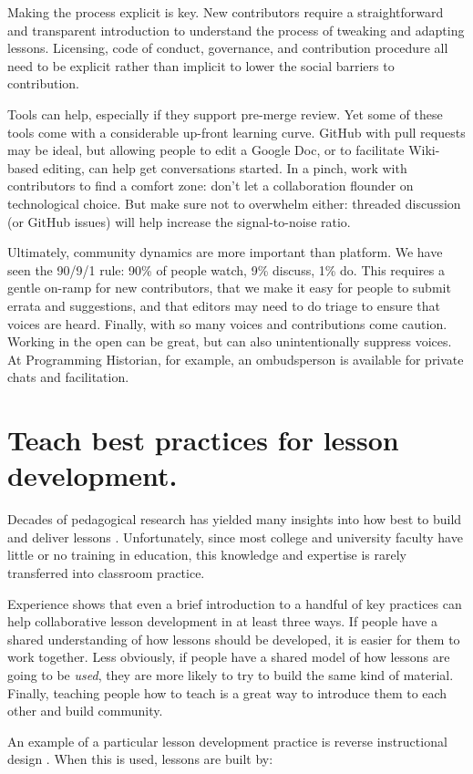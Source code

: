 \documentclass[10pt,letterpaper]{article}
\newcommand{\rulemajor}[1]{\section{#1}}
\begin{document}
Making the process explicit is key.
New contributors require a straightforward and transparent introduction
to understand the process of tweaking and adapting lessons.
Licensing, code of conduct, governance, and contribution procedure
all need to be explicit rather than implicit
to lower the social barriers to contribution.

Tools can help,
especially if they support pre-merge review.
Yet some of these tools come with a considerable up-front learning curve.
GitHub with pull requests may be ideal,
but allowing people to edit a Google Doc,
or to facilitate Wiki-based editing,
can help get conversations started.
In a pinch,
work with contributors to find a comfort zone:
don't let a collaboration flounder on technological choice.
But make sure not to overwhelm either:
threaded discussion (or GitHub issues) will help increase the signal-to-noise ratio.

Ultimately,
community dynamics are more important than platform.
We have seen the 90/9/1 rule:
90\% of people watch, 9\% discuss, 1\% do.
This requires a gentle on-ramp for new contributors,
that we make it easy for people to submit errata and suggestions,
and that editors may need to do triage to ensure that voices are heard.
Finally, with so many voices and contributions come caution.
Working in the open can be great,
but can also unintentionally suppress voices.
At Programming Historian,
for example,
an ombudsperson is available for private chats and facilitation.

\rulemajor{Teach best practices for lesson development.}

Decades of pedagogical research has yielded many insights into
how best to build and deliver lessons \cite{hlw}.
Unfortunately,
since most college and university faculty have little or no training in education,
this knowledge and expertise is rarely transferred into classroom practice.

Experience shows that even a brief introduction to a handful of key practices
can help collaborative lesson development in at least three ways.
If people have a shared understanding of how lessons should be developed,
it is easier for them to work together.
Less obviously,
if people have a shared model of how lessons are going to be \emph{used},
they are more likely to try to build the same kind of material.
Finally,
teaching people how to teach is a great way to introduce them to each other and build community.

An example of a particular lesson development practice is reverse instructional design
\cite{wiggins-mctighe}.
When this is used,
lessons are built by:
\end{document}
